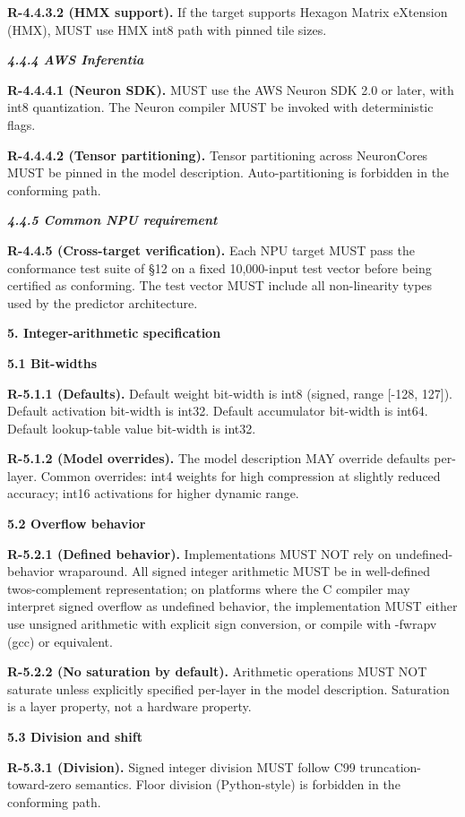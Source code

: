 \documentclass[
]{article}
\begin{document}
\textbf{R-4.4.3.2 (HMX support).} If the target supports Hexagon Matrix
eXtension (HMX), MUST use HMX int8 path with pinned tile sizes.

\emph{\textbf{4.4.4 AWS Inferentia}}

\textbf{R-4.4.4.1 (Neuron SDK).} MUST use the AWS Neuron SDK 2.0 or
later, with int8 quantization. The Neuron compiler MUST be invoked with
deterministic flags.

\textbf{R-4.4.4.2 (Tensor partitioning).} Tensor partitioning across
NeuronCores MUST be pinned in the model description. Auto-partitioning
is forbidden in the conforming path.

\emph{\textbf{4.4.5 Common NPU requirement}}

\textbf{R-4.4.5 (Cross-target verification).} Each NPU target MUST pass
the conformance test suite of §12 on a fixed 10,000-input test vector
before being certified as conforming. The test vector MUST include all
non-linearity types used by the predictor architecture.

\textbf{5. Integer-arithmetic specification}

\textbf{5.1 Bit-widths}

\textbf{R-5.1.1 (Defaults).} Default weight bit-width is int8 (signed,
range {[}-128, 127{]}). Default activation bit-width is int32. Default
accumulator bit-width is int64. Default lookup-table value bit-width is
int32.

\textbf{R-5.1.2 (Model overrides).} The model description MAY override
defaults per-layer. Common overrides: int4 weights for high compression
at slightly reduced accuracy; int16 activations for higher dynamic
range.

\textbf{5.2 Overflow behavior}

\textbf{R-5.2.1 (Defined behavior).} Implementations MUST NOT rely on
undefined-behavior wraparound. All signed integer arithmetic MUST be in
well-defined two\textquotesingle s-complement representation; on
platforms where the C compiler may interpret signed overflow as
undefined behavior, the implementation MUST either use unsigned
arithmetic with explicit sign conversion, or compile with -fwrapv (gcc)
or equivalent.

\textbf{R-5.2.2 (No saturation by default).} Arithmetic operations MUST
NOT saturate unless explicitly specified per-layer in the model
description. Saturation is a layer property, not a hardware property.

\textbf{5.3 Division and shift}

\textbf{R-5.3.1 (Division).} Signed integer division MUST follow C99
truncation-toward-zero semantics. Floor division (Python-style) is
forbidden in the conforming path.
\end{document}
